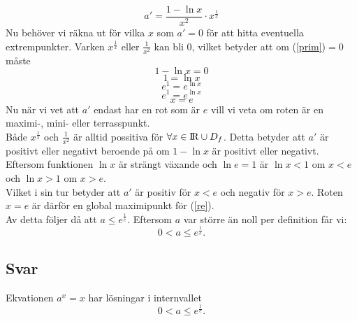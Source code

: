\documentclass[11pt]{article}
\begin{document}
\begin{equation}\label{prim}
a' =\frac{1 - \ln x}{x^2} \cdot x^{\frac{1}{x}}
\end{equation}
Nu behöver vi räkna ut för vilka $x$ som $a'=0$ för att hitta eventuella extrempunkter.
Varken $x^{\frac{1}{x}}$ eller $\frac{1}{x^2}$ kan bli 0, vilket betyder att om (\ref{prim})$=0$ måste 
$$1-\ln x = 0$$
$$1 = \ln x$$
$$e^1 = e^{\ln x}$$
$$e^1 = e^{\ln x}$$
$$x = e$$
Nu när vi vet att $a'$ endast har en rot som är $e$ vill vi veta om roten är en maximi-, mini- eller terrasspunkt.\\
Både $x^{\frac{1}{x}}$ och $\frac{1}{x^2}$ är alltid possitiva för $\forall x\in {\rm I\!R} \cup D_f$.
Detta betyder att $a'$ är positivt eller negativt beroende på om $1-\ln x$ är positivt eller negativt.\\
Eftersom funktionen $\ln x$ är strängt växande och $\ln e = 1$ är $\ln x < 1$ om $x < e$ och $\ln x > 1$ om $x > e$. \\
Vilket i sin tur betyder att $a'$ är positiv för $x < e$ och negativ för $x > e$. Roten $x = e$ är därför en global maximipunkt för (\ref{re}).\\
Av detta följer då att $a \leq e^{\frac{1}{e}}.$ Eftersom $a$ var större än noll per definition får vi:
$$0 < a \leq e^{\frac{1}{e}}.$$
\subsection{Svar}
Ekvationen $a^x = x$ har lösningar i internvallet $$0 < a \leq e^{\frac{1}{e}}.$$
\end{document}

